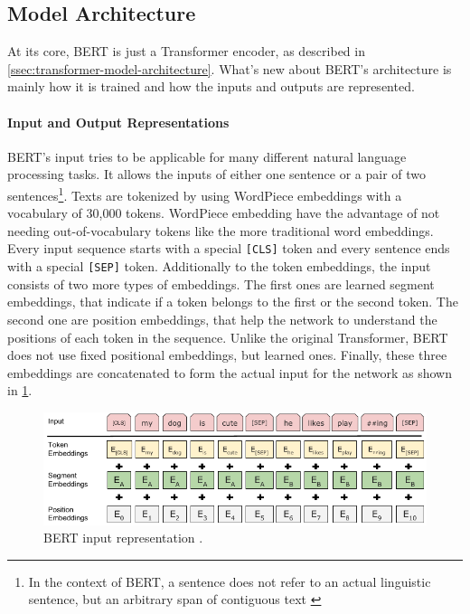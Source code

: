 \subsection{Model Architecture}

At its core, BERT is just a Transformer encoder, as described in \cref{ssec:transformer-model-architecture}.
What's new about BERT's architecture is mainly how it is trained and how the inputs and outputs are represented.

\paragraph{Input and Output Representations}

BERT's input tries to be applicable for many different natural language processing tasks.
It allows the inputs of either one sentence or a pair of two sentences\footnote{In the context of BERT, a sentence does not refer to an actual linguistic sentence, but an arbitrary span of contiguous text \cite[p.~4]{devlin2018bert}}.
Texts are tokenized by using WordPiece embeddings with a vocabulary of 30,000 tokens. 
WordPiece embedding have the advantage of not needing out-of-vocabulary tokens like the more traditional word embeddings.
Every input sequence starts with a special \texttt{[CLS]} token and every sentence ends with a special \texttt{[SEP]} token.
Additionally to the token embeddings, the input consists of two more types of embeddings.
The first ones are learned segment embeddings, that indicate if a token belongs to the first or the second token.
The second one are position embeddings, that help the network to understand the positions of each token in the sequence.
Unlike the original Transformer, BERT does not use fixed positional embeddings, but learned ones.
Finally, these three embeddings are concatenated to form the actual input for the network as shown in \cref{fig:bert-input-representation}.

\begin{figure}[h]
\centering
\includegraphics{figures/bert-input-representation}
\caption[BERT input representation]{BERT input representation \cite[p.~5]{devlin2018bert}.}
\label{fig:bert-input-representation}
\end{figure}

